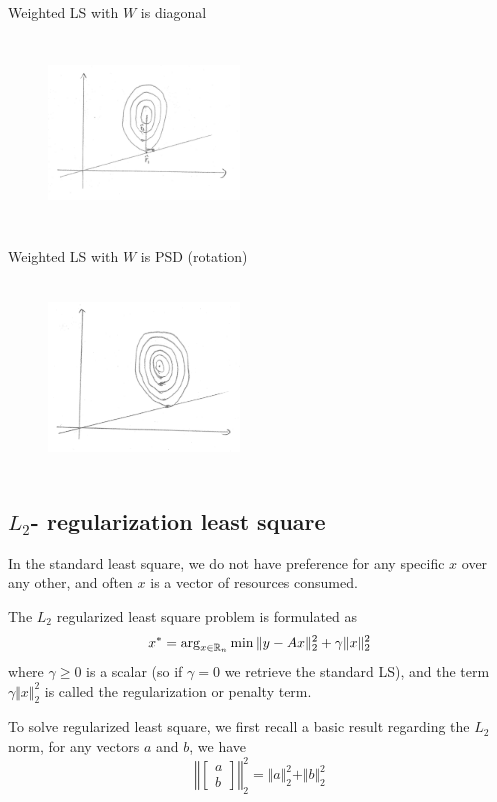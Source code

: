 Weighted LS with $W$ is diagonal 

\begin{figure}
	\centering
	\includegraphics[width=2in,height=2in]{figures/ch06/ch06-04.jpg}
\end{figure}

Weighted LS with $W$ is PSD (rotation)

\begin{figure}
	\centering
	\includegraphics[width=2in,height=2in]{figures/ch06/ch06-05.jpg}
\end{figure}



\subsection{$L_2$- regularization least square}

In the standard least square, we do not have preference for any specific $x$ over any other, and often $x$ is a vector of resources consumed.


The $L_2$ regularized least square problem is formulated as
$$x^*=\arg_{x\in\mathbb{R}_{n}} \min \Vert y-Ax\Vert ^2_2 + \gamma \Vert x\Vert ^2_2$$
where $\gamma\geq 0$ is a scalar (so if $\gamma = 0$ we retrieve the standard LS), and the term $\gamma \Vert x\Vert ^2_2$ is called the regularization or penalty term.


To solve regularized least square, we first recall a basic result regarding the $L_2$ norm, for any vectors $a$ and $b$, we have
$$\left\Vert 
\begin{bmatrix}
a\\
b
\end{bmatrix}
\right\Vert_2^2
=\Vert a \Vert_2^2 + \Vert b \Vert_2^2$$

